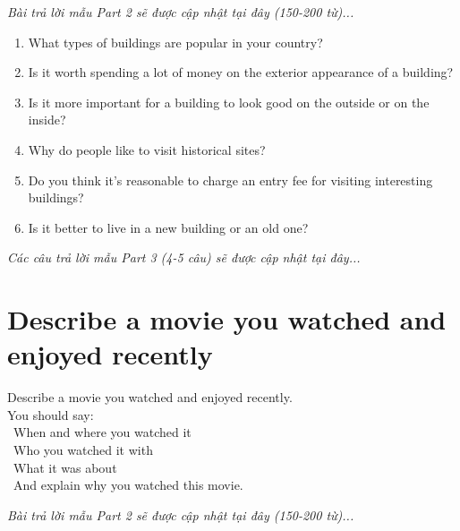\vspace{1em}
\textit{Bài trả lời mẫu Part 2 sẽ được cập nhật tại đây (150-200 từ)...}
\vspace{2em}

\begin{ieltsprompt}
\begin{enumerate}[itemsep=4pt]
    \item What types of buildings are popular in your country?
    \item Is it worth spending a lot of money on the exterior appearance of a building?
    \item Is it more important for a building to look good on the outside or on the inside?
    \item Why do people like to visit historical sites?
    \item Do you think it's reasonable to charge an entry fee for visiting interesting buildings?
    \item Is it better to live in a new building or an old one?
\end{enumerate}
\end{ieltsprompt}

\vspace{1em}
\textit{Các câu trả lời mẫu Part 3 (4-5 câu) sẽ được cập nhật tại đây...}
\vspace{2em}

\section{Describe a movie you watched and enjoyed recently}
\begin{ieltsprompt}
Describe a movie you watched and enjoyed recently. \\
You should say: \\
\textbullet\ When and where you watched it \\
\textbullet\ Who you watched it with \\
\textbullet\ What it was about \\
\textbullet\ And explain why you watched this movie. \\
\end{ieltsprompt}

\vspace{1em}
\textit{Bài trả lời mẫu Part 2 sẽ được cập nhật tại đây (150-200 từ)...}
\vspace{2em}

